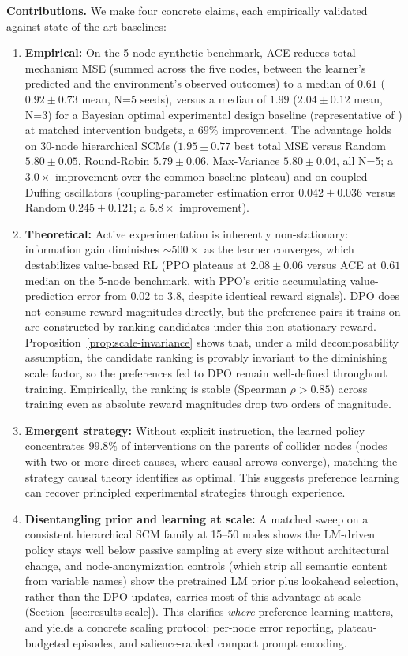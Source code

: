 \documentclass{article}
\theoremstyle{plain}
\theoremstyle{definition}
\theoremstyle{remark}
\begin{document}
\textbf{Contributions.} We make four concrete claims, each empirically validated against state-of-the-art baselines:
\begin{enumerate}[leftmargin=1.5em,topsep=0.2em,itemsep=0.1em]
\item \textbf{Empirical:} On the 5-node synthetic benchmark, ACE reduces total mechanism MSE (summed across the five nodes, between the learner's predicted and the environment's observed outcomes) to a median of $0.61$ ($0.92\pm0.73$ mean, N=5 seeds), versus a median of $1.99$ ($2.04\pm0.12$ mean, N=3) for a Bayesian optimal experimental design baseline (representative of \citealp{toth2022active,tigas2022interventions}) at matched intervention budgets, a $69\%$ improvement. The advantage holds on 30-node hierarchical SCMs ($1.95\pm0.77$ best total MSE versus Random $5.80\pm0.05$, Round-Robin $5.79\pm0.06$, Max-Variance $5.80\pm0.04$, all N=5; a $3.0\times$ improvement over the common baseline plateau) and on coupled Duffing oscillators (coupling-parameter estimation error $0.042\pm0.036$ versus Random $0.245\pm0.121$; a $5.8\times$ improvement).
\item \textbf{Theoretical:} Active experimentation is inherently non-stationary: information gain diminishes $\sim 500\times$ as the learner converges, which destabilizes value-based RL (PPO plateaus at $2.08\pm0.06$ versus ACE at $0.61$ median on the 5-node benchmark, with PPO's critic accumulating value-prediction error from $0.02$ to $3.8$, despite identical reward signals). DPO does not consume reward magnitudes directly, but the preference pairs it trains on are constructed by ranking candidates under this non-stationary reward. Proposition~\ref{prop:scale-invariance} shows that, under a mild decomposability assumption, the candidate ranking is provably invariant to the diminishing scale factor, so the preferences fed to DPO remain well-defined throughout training. Empirically, the ranking is stable (Spearman $\rho > 0.85$) across training even as absolute reward magnitudes drop two orders of magnitude.
\item \textbf{Emergent strategy:} Without explicit instruction, the learned policy concentrates $99.8\%$ of interventions on the parents of collider nodes (nodes with two or more direct causes, where causal arrows converge), matching the strategy causal theory identifies as optimal. This suggests preference learning can recover principled experimental strategies through experience.
\item \textbf{Disentangling prior and learning at scale:} A matched sweep on a consistent hierarchical SCM family at 15--50 nodes shows the LM-driven policy stays well below passive sampling at every size without architectural change, and node-anonymization controls (which strip all semantic content from variable names) show the pretrained LM prior plus lookahead selection, rather than the DPO updates, carries most of this advantage at scale (Section~\ref{sec:results-scale}). This clarifies \emph{where} preference learning matters, and yields a concrete scaling protocol: per-node error reporting, plateau-budgeted episodes, and salience-ranked compact prompt encoding.
\end{enumerate}
\end{document}
